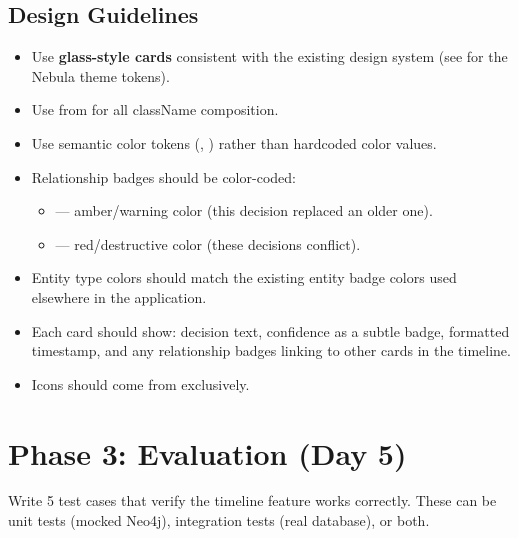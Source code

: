 \subsection{Design Guidelines}

\begin{itemize}
    \item Use \textbf{glass-style cards} consistent with the existing
          \sysname{} design system (see
           for the Nebula theme tokens).
    \item Use  from  for all className
          composition.
    \item Use semantic color tokens (,
          ) rather than hardcoded color values.
    \item Relationship badges should be color-coded:
          \begin{itemize}
              \item {} --- amber/warning color (this decision
                    replaced an older one).
              \item {} --- red/destructive color (these
                    decisions conflict).
          \end{itemize}
    \item Entity type colors should match the existing entity badge
          colors used elsewhere in the application.
    \item Each card should show: decision text, confidence as a subtle
          badge, formatted timestamp, and any relationship badges linking
          to other cards in the timeline.
    \item Icons should come from  exclusively.
\end{itemize}


\section{Phase 3: Evaluation (Day 5)}
\label{sec:starter-evaluation}

Write 5 test cases that verify the timeline feature works correctly.
These can be unit tests (mocked Neo4j), integration tests (real database),
or both.

